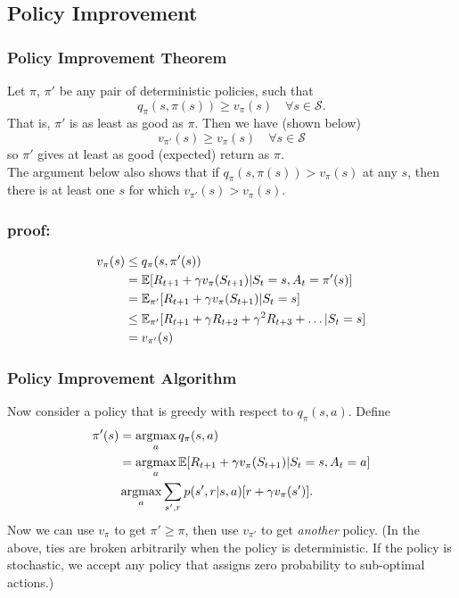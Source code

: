 \subsection{Policy Improvement}
\subsubsection*{Policy Improvement Theorem}

Let $\pi$, $\pi'$ be any pair of deterministic policies, such that
\begin{equation}
    q_\pi(s, \pi(s)) \geq v_\pi(s) \quad \forall s \in \mathcal{S}.
\end{equation}
That is, $\pi'$ is as least as good as $\pi$. Then we have (shown below)
\begin{equation}
    v_{\pi'}(s) \geq v_\pi(s) \quad \forall s \in \mathcal{S}
\end{equation}
so $\pi'$ gives at least as good (expected) return as $\pi$.\\

The argument below also shows that if $q_\pi(s, \pi(s)) > v_\pi(s)$ at any $s$, then there is at least one $s$ for which $v_{\pi'}(s) > v_\pi(s)$.
\subsubsection*{proof:}
\begin{align*}
    v_\pi(s) & \leq q_\pi(s, \pi'(s)) \\
             & = \mathbb{E}{}[R_{t+1} + \gamma v_\pi(S_{t+1}) | S_t=s, A_t=\pi'(s)] \\
             & = \mathbb{E}{}_{\pi'} [R_{t+1} + \gamma v_\pi(S_{t+1}) | S_t=s] \\
             & \leq \mathbb{E}{}_{\pi'} [R_{t+1} + \gamma R_{t+2} + \gamma^2 R_{t+3} + \dots| S_t=s] \\
             & = v_{\pi'}(s)
\end{align*}

\subsubsection*{Policy Improvement Algorithm}
Now consider a policy that is greedy with respect to $q_\pi(s, a)$. Define 
\begin{align}
    \pi'(s) &= \operatorname*{argmax}_a q_\pi(s, a) \\ 
            &= \operatorname*{argmax}_a \mathbb{E}{} [R_{t+1} + \gamma v_\pi(S_{t+1}) | S_t=s, A_t=a] \\
            & \operatorname*{argmax}_a \sum_{s', r} p(s', r|s, a)[ r + \gamma v_\pi(s')].
\end{align}
Now we can use $v_\pi$ to get $\pi' \geq \pi$, then use $v_{\pi'}$ to get \emph{another} policy. (In the above, ties are broken arbitrarily when the policy is deterministic. If the policy is stochastic, we accept any policy that assigns zero probability to sub-optimal actions.)\\

